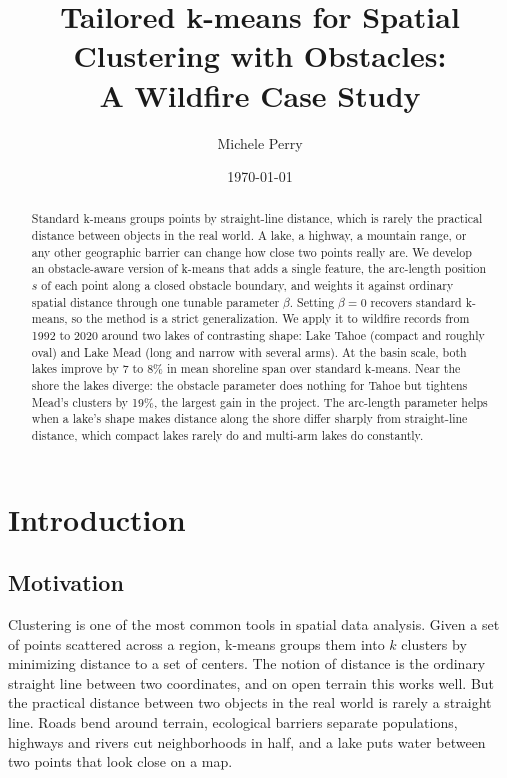\documentclass[11pt]{article}
\title{Tailored k-means for Spatial Clustering with Obstacles:\\
A Wildfire Case Study}
\author{Michele Perry}
\date{\today}
\begin{document}
\maketitle

\begin{abstract}
Standard k-means groups points by straight-line distance, which is rarely the practical distance between objects in the real world. A lake, a highway, a mountain range, or any other geographic barrier can change how close two points really are. We develop an obstacle-aware version of k-means that adds a single feature, the arc-length position $s$ of each point along a closed obstacle boundary, and weights it against ordinary spatial distance through one tunable parameter $\beta$. Setting $\beta = 0$ recovers standard k-means, so the method is a strict generalization. We apply it to wildfire records from 1992 to 2020 around two lakes of contrasting shape: Lake Tahoe (compact and roughly oval) and Lake Mead (long and narrow with several arms). At the basin scale, both lakes improve by 7 to 8\% in mean shoreline span over standard k-means. Near the shore the lakes diverge: the obstacle parameter does nothing for Tahoe but tightens Mead's clusters by 19\%, the largest gain in the project. The arc-length parameter helps when a lake's shape makes distance along the shore differ sharply from straight-line distance, which compact lakes rarely do and multi-arm lakes do constantly. 
\end{abstract}
 
\section{Introduction}
 
\subsection{Motivation}
 
Clustering is one of the most common tools in spatial data analysis. Given a set of points scattered across a region, k-means groups them into $k$ clusters by minimizing distance to a set of centers. The notion of distance is the ordinary straight line between two coordinates, and on open terrain this works well. But the practical distance between two objects in the real world is rarely a straight line. Roads bend around terrain, ecological barriers separate populations, highways and rivers cut neighborhoods in half, and a lake puts water between two points that look close on a map.
 
\end{document}
